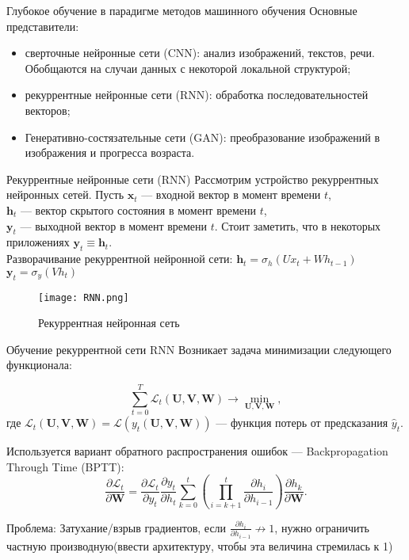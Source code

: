 \documentclass[11pt]{beamer}
\begin{document}
 \begin{frame}{Глубокое обучение в парадигме методов машинного обучения}
Основные представители:
\begin{itemize}
    \item сверточные нейронные сети (CNN): анализ изображений, текстов,
речи. Обобщаются на случаи данных с некоторой локальной
структурой;
    \item рекуррентные нейронные сети (RNN): обработка последовательностей
векторов;
\item Генеративно-состязательные сети (GAN): преобразование изображений в изображения и прогресса возраста.
\end{itemize}
	\end{frame}
  \begin{frame}{Рекуррентные нейронные сети (RNN)}
Рассмотрим устройство рекуррентных нейронных сетей. 
Пусть $\boldsymbol{x}_t$ — входной вектор в момент времени $t$,\\ $\boldsymbol{h}_t$ — вектор скрытого состояния в момент времени $t$,\\
$\boldsymbol{y}_t$ — выходной вектор в момент времени $t$. Стоит заметить, что в некоторых приложениях
$\boldsymbol{y}_t \equiv \boldsymbol{h}_t$. \\
Разворачивание рекуррентной нейронной сети:
$\boldsymbol{h}_t = \sigma_h(Ux_t + Wh_{t-1})$\\
$\boldsymbol{y}_t = \sigma_y (Vh_t) $


	    
	    \begin{figure}
	        \centering
	        \texttt{[image: RNN.png]}
	        \caption{Рекуррентная нейронная сеть}
	        \label{fig:my_label}
	    \end{figure}


	\end{frame}
\begin{frame}{ Обучение рекуррентной сети RNN}
Возникает задача минимизации следующего функционала:

\begin{equation*}
\sum_{t=0}^{T} \mathcal{L}_t (\mathbf{U}, \mathbf{V}, \mathbf{W}) \rightarrow \min_{\mathbf{U},\mathbf{ V}, \mathbf{W}},
\end{equation*}
где $\mathcal{L}_t (\mathbf{U}, \mathbf{V}, \mathbf{W}) = \mathcal{L} (y_t(\mathbf{U}, \mathbf{V}, \mathbf{W}))$ --- функция потерь от предсказания $\hat{y}_t$.

Используется вариант обратного распространения ошибок --- Backpropagation Through Time (BPTT):
\begin{equation*}
\dfrac{\partial \mathcal{L}_t}{\partial \mathbf{W}} = \dfrac{\partial \mathcal{L}_t}{\partial y_t} \dfrac{\partial y_t}{\partial h_t} \sum_{k=0}^t \left( \prod_{i = k + 1}^t \dfrac{\partial h_i}{\partial h_{i-1}} \right) \dfrac{\partial h_k}{\partial \mathbf{W}}.
\end{equation*}

Проблема:
Затухание/взрыв градиентов, если $\frac{\partial h_i}{\partial h_{i-1}}\nrightarrow 1$, нужно ограничить частную
производную(ввести архитектуру, чтобы эта величина стремилась к 1)


	\end{frame}
\end{document}
